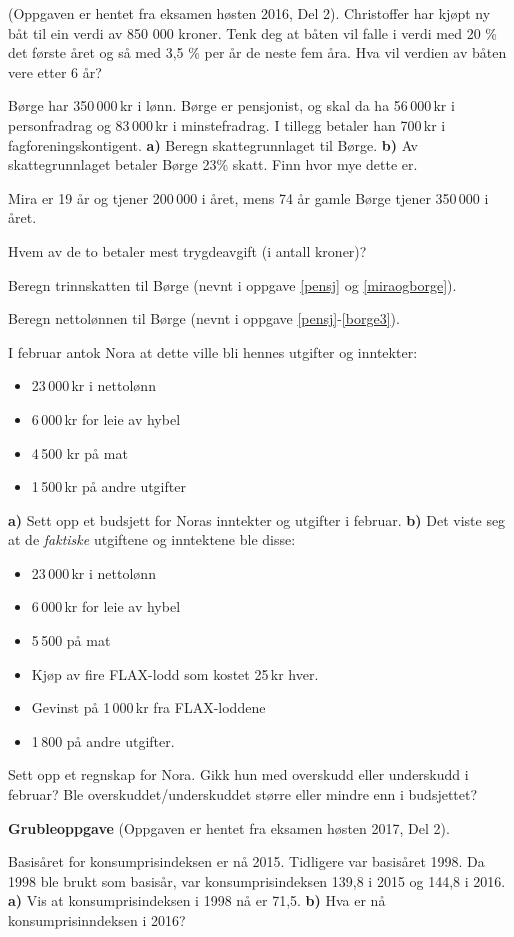(Oppgaven er hentet fra eksamen høsten 2016, Del 2).\os
Christoffer har kjøpt ny båt til ein verdi av 850 000 kroner.
Tenk deg at båten vil falle i verdi med 20 \% det første året og så med 3,5 \% per år de neste fem åra.\os
Hva vil verdien av båten vere etter 6 år? 

\nes

Børge har 350\,000\,kr i lønn. Børge er pensjonist, og skal da ha 56\,000\,kr i personfradrag og 83\,000\,kr i minstefradrag. I tillegg betaler han 700\,kr i fagforeningskontigent. \os
\textbf{a)} Beregn skattegrunnlaget til Børge.\os
\textbf{b)} Av skattegrunnlaget betaler Børge 23\% skatt. Finn hvor mye dette er.

Mira er 19 år og tjener 200\,000 i året, mens 74 år gamle Børge tjener 350\,000 i året. \os

Hvem av de to betaler mest trygdeavgift (i antall kroner)?

Beregn trinnskatten til Børge (nevnt i oppgave \ref{pensj} og \ref{miraogborge}).

Beregn nettolønnen til Børge (nevnt i oppgave \ref{pensj}-\ref{borge3}).

\nes

I februar antok Nora at dette ville bli hennes utgifter og inntekter:
\begin{itemize}
	\item 23\,000\,kr i nettolønn 
	\item 6\,000\,kr for leie av hybel
	\item 4\,500 kr på mat
	\item 1\,500\,kr på andre utgifter
\end{itemize}
\textbf{a)} Sett opp et budsjett for Noras inntekter og utgifter i februar.\os
\textbf{b)} Det viste seg at de \textsl{faktiske} utgiftene og inntektene ble disse:
\begin{itemize}
	\item 23\,000\,kr i nettolønn
	\item 6\,000\,kr for leie av hybel
	\item 5\,500 på mat
	\item Kjøp av fire FLAX-lodd som kostet 25\,kr hver.
	\item Gevinst på 1\,000\,kr fra FLAX-loddene
	\item 1\,800 på andre utgifter.
\end{itemize}
Sett opp et regnskap for Nora. Gikk hun med overskudd eller underskudd i februar? Ble overskuddet/underskuddet større eller mindre enn i budsjettet?
\vsk

\textbf{\color{blue}Grubleoppgave}\os
(Oppgaven er hentet fra eksamen høsten 2017, Del 2).\os

Basisåret for konsumprisindeksen er nå 2015. Tidligere var basisåret 1998.\os
Da 1998 ble brukt som basisår, var konsumprisindeksen 139,8 i 2015 og 144,8 i 2016.\os
\textbf{a)} Vis at konsumprisindeksen i 1998 nå er 71,5.\os
\textbf{b)} Hva er nå konsumprisinndeksen i 2016?


